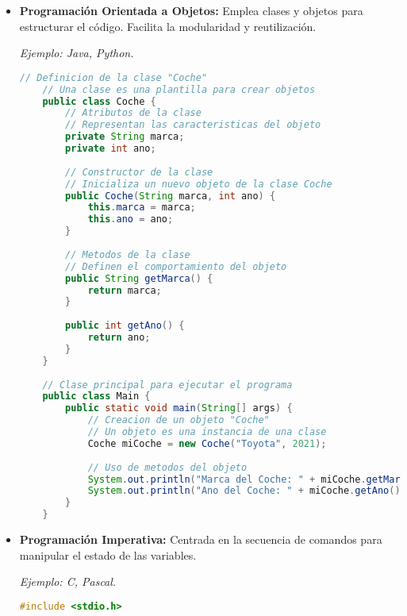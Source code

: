 \documentclass{report}
\begin{document}
\begin{itemize}
\item \textbf{Programación Orientada a Objetos:} Emplea clases y objetos para estructurar el código. Facilita la modularidad y reutilización. 

\textit{Ejemplo: Java, Python.}

\begin{minipage}{\linewidth}
    \begin{lstlisting}[language=Java, caption=Ejemplo de POO en Java]
    // Definicion de la clase "Coche"
    // Una clase es una plantilla para crear objetos
    public class Coche {
        // Atributos de la clase
        // Representan las caracteristicas del objeto
        private String marca;
        private int ano;
    
        // Constructor de la clase
        // Inicializa un nuevo objeto de la clase Coche
        public Coche(String marca, int ano) {
            this.marca = marca;
            this.ano = ano;
        }
    
        // Metodos de la clase
        // Definen el comportamiento del objeto
        public String getMarca() {
            return marca;
        }
    
        public int getAno() {
            return ano;
        }
    }
    
    // Clase principal para ejecutar el programa
    public class Main {
        public static void main(String[] args) {
            // Creacion de un objeto "Coche"
            // Un objeto es una instancia de una clase
            Coche miCoche = new Coche("Toyota", 2021);
    
            // Uso de metodos del objeto
            System.out.println("Marca del Coche: " + miCoche.getMarca());
            System.out.println("Ano del Coche: " + miCoche.getAno());
        }
    }
    \end{lstlisting}
    \end{minipage}

\item \textbf{Programación Imperativa:} Centrada en la secuencia de comandos para manipular el estado de las variables. 

\textit{Ejemplo: C, Pascal.}

\begin{minipage}{\linewidth} %
\begin{lstlisting}[language=C, caption=Ejemplo de Programacion Imperativa en C]
#include <stdio.h>


\end{lstlisting}
\end{minipage}
\end{itemize}
\end{document}
